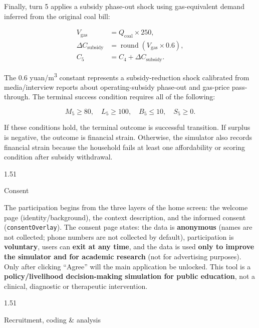 \documentclass[stu,12pt,floatsintext,donotrepeattitle]{apa7}
\makeatletter
\newcommand{\Sihao}{\fontsize{14pt}{18pt}\selectfont}
\renewcommand{\subsection}{\@startsection{subsection}{2}{\z@}%
  {1.5\baselineskip}{1\baselineskip}%
  {\normalfont\Sihao\bfseries\raggedright}}
\makeatother
\begin{document}
Finally, turn 5 applies a subsidy phase-out shock using gas-equivalent demand inferred from the original coal bill:

\begin{align}
V_{\mathrm{gas}} &= Q_{\mathrm{coal}} \times 250, \\
\Delta C_{\mathrm{subsidy}} &= \operatorname{round}(V_{\mathrm{gas}} \times 0.6), \\
C_5 &= C_4 + \Delta C_{\mathrm{subsidy}}.
\end{align}

The 0.6 yuan/m\textsuperscript{3} constant represents a subsidy-reduction shock calibrated from media/interview reports about operating-subsidy phase-out and gas-price pass-through. The terminal success condition requires all of the following:

\begin{equation}
M_5 \ge 80,\quad L_5 \ge 100,\quad B_5 \le 10,\quad S_5 \ge 0.
\end{equation}

If these conditions hold, the terminal outcome is successful transition. If surplus is negative, the outcome is financial strain. Otherwise, the simulator also records financial strain because the household fails at least one affordability or scoring condition after subsidy withdrawal.

\subsection{Consent}

The participation begins from the three layers of the home screen: the welcome page (identity/background), the context description, and the informed consent (\texttt{consentOverlay}). The consent page states: the data is \textbf{anonymous} (names are not collected; phone numbers are not collected by default), participation is \textbf{voluntary}, users can \textbf{exit at any time}, and the data is used \textbf{only to improve the simulator and for academic research} (not for advertising purposes). Only after clicking ``Agree'' will the main application be unlocked. This tool is a \textbf{policy/livelihood decision-making simulation for public education}, not a clinical, diagnostic or therapeutic intervention.

\subsection{Recruitment, coding \& analysis}
\end{document}
